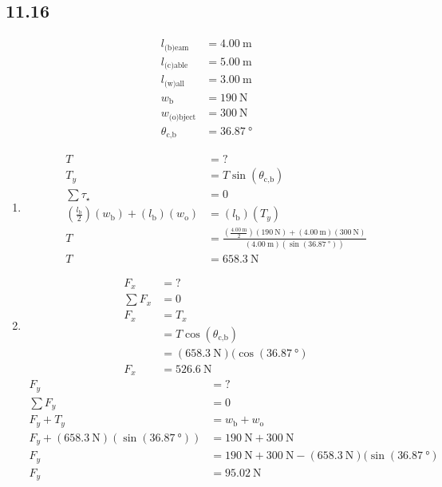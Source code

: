 \documentclass{article}
\begin{document}
\subsection{11.16}
\begin{align*}
	l_\text{(b)eam} & = \SI{4.00}{\meter} \\
	l_\text{(c)able} & = \SI{5.00}{\meter} \\
	l_\text{(w)all} & = \SI{3.00}{\meter} \\
	w_\text{b} & = \SI{190}{\newton} \\
	w_\text{(o)bject} & = \SI{300}{\newton} \\
	\theta_\text{c,b} & = \SI{36.87}{\degree}
\end{align*}
\begin{enumerate}[label=\textbf{(\alph*)}]
	\item
		\begin{align*}
			T & = ? \\
			T_y & = T\sin(\theta_\text{c,b}) \\
			\sum \tau_\star & = 0 \\
			\left( \frac{l_\text{b}}{2} \right)(w_\text{b}) + (l_\text{b})(w_\text{o}) & = (l_\text{b})(T_y) \\
			T & = \frac{ \left( \frac{\SI{4.00}{\meter}}{2} \right)(\SI{190}{\newton}) + (\SI{4.00}{\meter})(\SI{300}{\newton}) }{(\SI{4.00}{\meter})(\sin(\SI{36.87}{\degree}))} \\
			T & = \SI{658.3}{\newton}
		\end{align*}
	\item
		\begin{align*}
			F_x & = ? \\
			\sum F_x & = 0 \\
			F_x & = T_x \\
				& = T\cos(\theta_\text{c,b}) \\
				& = (\SI{658.3}{\newton})(\cos(\SI{36.87}{\degree}) \\
			F_x & = \SI{526.6}{\newton}
		\end{align*}
		\begin{align*}
			F_y & = ? \\
			\sum F_y & = 0 \\
			F_y + T_y & = w_\text{b} + w_\text{o} \\
			F_y + (\SI{658.3}{\newton})(\sin(\SI{36.87}{\degree})) & = \SI{190}{\newton} + \SI{300}{\newton} \\
			F_y & = \SI{190}{\newton} + \SI{300}{\newton} - (\SI{658.3}{\newton})(\sin(\SI{36.87}{\degree}) \\
			F_y & = \SI{95.02}{\newton}
		\end{align*}
\end{enumerate}
\end{document}
